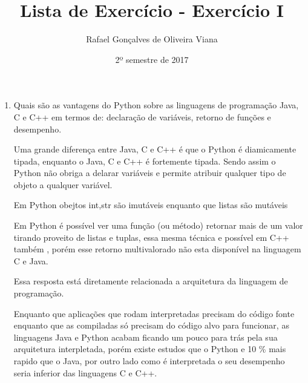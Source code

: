 \documentclass[12pt]{article}
\title{Lista de Exercício  - Exercício I }
\author{Rafael Gonçalves de  Oliveira Viana}
\date{2º semestre de 2017}
\begin{document}
\maketitle

\begin{enumerate}
\item
Quais são as vantagens do Python sobre as linguagens de programação Java, C e C++
em termos de: declaração de variáveis, retorno de funções e desempenho.


	
	
	 Uma grande diferença entre Java, C e C++ é que o Python é diamicamente tipada, enquanto o Java, C e C++ é fortemente tipada. Sendo assim o Python não obriga a delarar variáveis e permite atribuir qualquer tipo de objeto a qualquer variável.
	 
	 Em Python obejtos int,str são imutáveis enquanto que listas são mutáveis
	 
		 
	Em Python é possível ver uma função (ou método) retornar mais de um valor tirando proveito de listas e tuplas, essa mesma técnica e possível em C++ também , porém esse retorno multivalorado não esta disponível na linguagem C e Java.
	 
	 Essa resposta está diretamente relacionada a arquitetura da linguagem de programação.
	 
	 Enquanto que aplicações que rodam interpretadas precisam do código fonte enquanto que as compiladas só precisam do código alvo para funcionar, as linguagens Java e Python acabam ficando um pouco para trás pela sua arquitetura interpletada, porém existe estudos que o Python e 10 \% mais rapido que o Java, por outro lado como é interpretada o seu desempenho seria inferior das linguagens C e C++.
	 

\end{enumerate}
\end{document}
